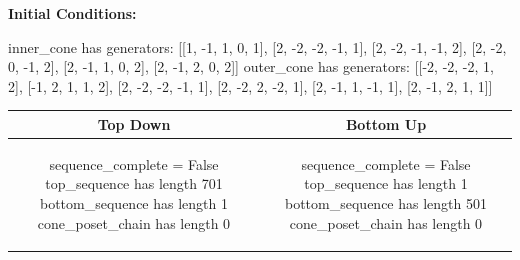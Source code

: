 \documentclass[10pt]{article}
\begin{document}
\textbf{Initial Conditions:}
\begin{SAGE}
inner_cone has generators: 
[[1, -1, 1, 0, 1], [2, -2, -2, -1, 1], [2, -2, -1, -1, 2], [2, -2, 0, -1, 2], [2, -1, 1, 0, 2], [2, -1, 2, 0, 2]]
outer_cone has generators: 
[[-2, -2, -2, 1, 2], [-1, 2, 1, 1, 2], [2, -2, -2, -1, 1], [2, -2, 2, -2, 1], [2, -1, 1, -1, 1], [2, -1, 2, 1, 1]]

\end{SAGE}
\begin{tabular}{c|c}
\textbf{Top Down} & \textbf{Bottom Up} \\ \hline  
\begin{SAGE}
sequence_complete = False
top_sequence has length 701
bottom_sequence has length 1
cone_poset_chain has length 0
\end{SAGE} 
&
\begin{SAGE}
sequence_complete = False
top_sequence has length 1
bottom_sequence has length 501
cone_poset_chain has length 0
\end{SAGE} 
\\ \hline


\end{tabular}
\end{document}
